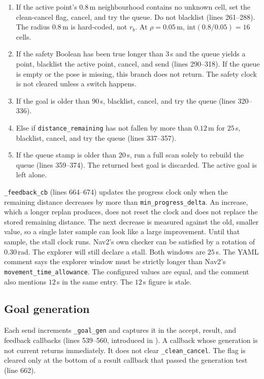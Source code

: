 \documentclass[11pt]{article}
\begin{document}
\begin{enumerate}
\item If the active point's $0.8$\,m neighbourhood contains no unknown cell, set the clean-cancel flag, cancel, and try the queue. Do not blacklist (lines 261--288). The radius $0.8$\,m is hard-coded, not $r_b$. At $\rho=0.05$\,m, $\mathrm{int}(0.8/0.05)=16$ cells.
\item If the safety Boolean has been true longer than $3$\,s and the queue yields a point, blacklist the active point, cancel, and send (lines 290--318). If the queue is empty or the pose is missing, this branch does not return. The safety clock is not cleared unless a switch happens.
\item If the goal is older than $90$\,s, blacklist, cancel, and try the queue (lines 320--336).
\item Else if \texttt{distance\_remaining} has not fallen by more than $0.12$\,m for $25$\,s, blacklist, cancel, and try the queue (lines 337--357).
\item If the queue stamp is older than $20$\,s, run a full scan solely to rebuild the queue (lines 359--374). The returned best goal is discarded. The active goal is left alone.
\end{enumerate}

\texttt{\_feedback\_cb} (lines 664--674) updates the progress clock only when the remaining distance decreases by more than \texttt{min\_progress\_delta}. An increase, which a longer replan produces, does not reset the clock and does not replace the stored remaining distance. The next decrease is measured against the old, smaller value, so a single later sample can look like a large improvement. Until that sample, the stall clock runs. Nav2's own checker can be satisfied by a rotation of $0.30$\,rad. The explorer will still declare a stall. Both windows are $25$\,s. The YAML comment says the explorer window must be strictly longer than Nav2's \texttt{movement\_time\_allowance}. The configured values are equal, and the comment also mentions $12$\,s in the same entry. The $12$\,s figure is stale.

\subsection{Goal generation}
Each send increments \texttt{\_goal\_gen} and captures it in the accept, result, and feedback callbacks (lines 539--560, introduced in ). A callback whose generation is not current returns immediately. It does not clear \texttt{\_clean\_cancel}. The flag is cleared only at the bottom of a result callback that passed the generation test (line 662).
\end{document}
